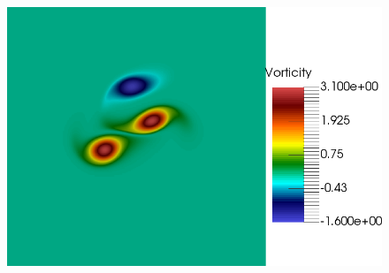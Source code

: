\begin{figure}[t]
\includegraphics[scale=0.06]{data/Incompressible_Euler/Snapshots/Full_2.png}\\


\end{figure}
